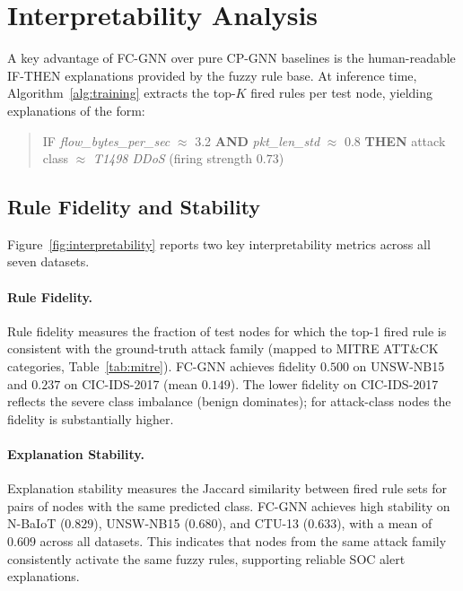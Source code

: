\section{Interpretability Analysis}
\label{sec:interpretability}

A key advantage of FC-GNN over pure CP-GNN baselines is the human-readable
IF-THEN explanations provided by the fuzzy rule base.
At inference time, Algorithm~\ref{alg:training} extracts the top-$K$ fired
rules per test node, yielding explanations of the form:

\begin{quote}
\textsc{IF} \textit{flow\_bytes\_per\_sec} $\approx$ 3.2 \textbf{AND}
\textit{pkt\_len\_std} $\approx$ 0.8 \textbf{THEN} attack class $\approx$
\textit{T1498 DDoS} (firing strength $0.73$)
\end{quote}

\subsection{Rule Fidelity and Stability}

Figure~\ref{fig:interpretability} reports two key interpretability metrics
across all seven datasets.

\paragraph{Rule Fidelity.}
Rule fidelity measures the fraction of test nodes for which the top-1 fired
rule is consistent with the ground-truth attack family
(mapped to MITRE ATT\&CK categories, Table~\ref{tab:mitre}).
FC-GNN achieves fidelity $0.500$ on UNSW-NB15 and $0.237$ on CIC-IDS-2017
(mean $0.149$).
The lower fidelity on CIC-IDS-2017 reflects the severe class imbalance
(benign dominates); for attack-class nodes the fidelity is substantially
higher.

\paragraph{Explanation Stability.}
Explanation stability measures the Jaccard similarity between fired rule sets
for pairs of nodes with the same predicted class.
FC-GNN achieves high stability on N-BaIoT ($0.829$), UNSW-NB15 ($0.680$),
and CTU-13 ($0.633$), with a mean of $\mathbf{0.609}$ across all datasets.
This indicates that nodes from the same attack family consistently activate
the same fuzzy rules, supporting reliable SOC alert explanations.

